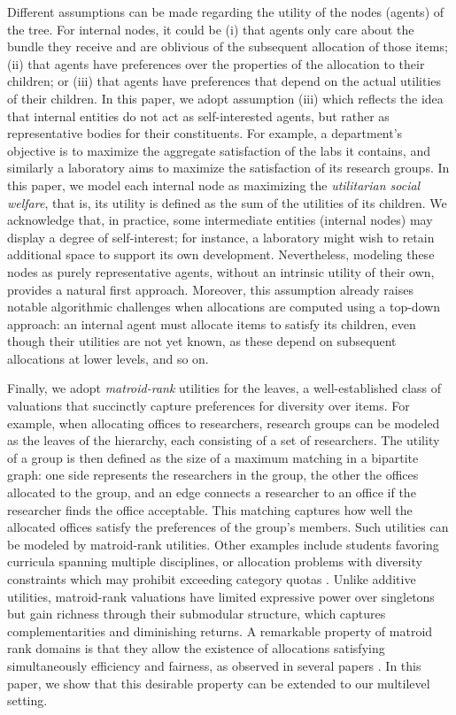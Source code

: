 \documentclass[]{article}
\begin{document}
Different assumptions can be made regarding the utility of the nodes (agents) of the tree. For internal nodes, it could be (i) that agents only care about the bundle they receive and are oblivious of the subsequent allocation of those items; (ii) that agents have preferences over the properties of the allocation to their children; or (iii) that agents have preferences that depend on the actual utilities of their children. 
In this paper, we adopt assumption (iii) which reflects the idea that internal entities do not act as self-interested agents, but rather as representative bodies for their constituents. 
For example, a department’s objective is to maximize the aggregate satisfaction of the labs it contains, and similarly a laboratory aims to maximize the satisfaction of its research groups. In this paper, we model each internal node as maximizing the {\em utilitarian social welfare}, that is, its utility is defined as the sum of the utilities of its children. We acknowledge that, in practice, some intermediate entities (internal nodes) may display a degree of self-interest; for instance, a laboratory might wish to retain additional space to support its own development. Nevertheless, modeling these nodes as purely representative agents, without an intrinsic utility of their own, provides a natural first approach. Moreover, this assumption already raises notable algorithmic challenges when allocations are computed using a top-down approach: an internal agent must allocate items to satisfy its children, even though their utilities are not yet known, as these depend on subsequent allocations at lower levels, and so on. 

Finally, we adopt \textit{matroid-rank} utilities for the leaves, a well-established class of valuations that succinctly capture preferences for diversity over items. For example, when allocating offices to researchers, research groups can be modeled as the leaves of the hierarchy, each consisting of a set of researchers. The utility of a group is then defined as the size of a maximum matching in a bipartite graph: one side represents the researchers in the group, the other the offices allocated to the group, and an edge connects a researcher to an office if the researcher finds the office acceptable. This matching captures how well the allocated offices satisfy the preferences of the group’s members. Such utilities can be modeled by matroid-rank utilities. Other examples include students favoring curricula spanning multiple disciplines, or allocation problems with diversity constraints which may prohibit exceeding category quotas 
\cite{Benabbou_et_al_2019}. Unlike additive utilities, matroid-rank valuations have limited expressive power over singletons but gain richness through their submodular structure, which captures complementarities and diminishing returns. A remarkable property of matroid rank domains is that they allow the existence of allocations satisfying simultaneously efficiency and fairness, as observed in several papers \cite{Benabbou_et_al2021, Babaioff_et_al2021, Viswanathan_Zick2023b, Viswanathan_Zick2023a}. In this paper, we show that this desirable property can be extended to our multilevel setting.
\end{document}
